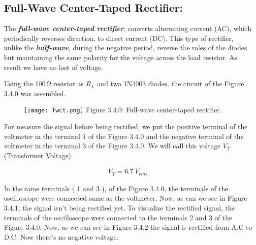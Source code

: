 \subsection{Full-Wave Center-Taped Rectifier:}

The {\bfseries\itshape full-wave center-taped rectifier}, converts alternating current (AC), which periodically reverses direction, to direct current (DC). This type of rectifier, unlike the {\bfseries\itshape half-wave}, during the negative period, reverse the roles of the diodes but maintaining the same polarity for the voltage across the load resistor. As result we have no lost of voltage. \hfill \break 

Using the 100$\Omega$ resistor as $R_{L}$ and two 1N4003 diodes, the circuit of the Figure 3.4.0 was assembled. 

\begin{figure}[H]
\texttt{[image: fwct.png]}
\centering \linebreak \linebreak Figure 3.4.0: Full-wave center-taped rectifier.
\end{figure}

For measure the signal before being rectified, we put the positive terminal of the voltmeter in the terminal 1 of the Figure 3.4.0 and the negative terminal of the voltmeter in the terminal 3 of the Figure 3.4.0. We will call this voltage $V_{T}$ (Transformer Voltage).

\begin{ceqn}
\begin{align}
V_{T} = 6.7\ V_{rms}
\end{align}
\end{ceqn}

{\bfseries\itshape\color{OliveGreen}{Observation:}} {\bfseries\itshape{}} \hfill \break

In the same terminals ( 1 and 3 ), of the Figure 3.4.0, the terminals of the oscilloscope were connected same as the voltmeter. Now, as can we see in Figure 3.4.1, the signal isn't being rectified yet. To visualize the rectified signal, the terminals of the oscilloscope were connected to the terminals 2 and 3 of the Figure 3.4.0. Now, as we can see in Figure 3.4.2 the signal is rectified from A.C to D.C. Now there's no negative voltage.

